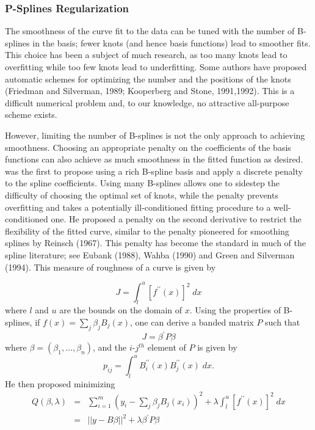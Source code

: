 \documentclass[12pt]{article}
\newcommand*\needsparaphrased{\color{red}}
\newcommand*\outlineskeleton{\color{green}}
\begin{document}
\subsubsection{{\outlineskeleton P-Splines Regularization}}

The smoothness of the curve fit to the data can be tuned with the number of B-splines in the basis; fewer knots (and hence basis functions) lead to smoother fits. This choice has been a subject of much research, as too many knots lead to overfitting while too few knots lead to underfitting. { \needsparaphrased Some authors have proposed automatic schemes for optimizing the number and the positions of the knots (Friedman and Silverman, 1989; Kooperberg and Stone, 1991,1992). This is a difficult numerical problem and, to our knowledge, no attractive all-purpose scheme exists.}

However, limiting the number of B-splines is not the only approach to achieving smoothness. Choosing an appropriate penalty on the coefficients of the basis functions can also achieve as much smoothness in the fitted function as desired. \cite{o1986statistical} was the first to propose using a rich B-spline basis and apply a discrete penalty to the spline coefficients. Using many B-splines allows one to sidestep the difficulty of choosing the optimal set of knots, while the penalty prevents overfitting and takes a potentially ill-conditioned fitting procedure to a well-conditioned one. He proposed a penalty on the second derivative to restrict the flexibility of the fitted curve, similar to the penalty pioneered for smoothing splines by Reinsch (1967). This penalty has become the standard in much of the spline literature; see Eubank (1988), Wahba (1990) and Green and Silverman (1994). This measure of roughness of a curve is given by 
 
 \[
 J = \int_l^u \left[ f^{\prime \prime}\left(x\right)\right]^2\;dx
 \]
 \noindent
 where $l$ and $u$ are the bounds on the domain of $x$. Using the properties of B-splines, if $f\left(x\right) = \sum_{j} \beta_j B_j\left(x\right)$, one can derive a banded matrix $P$ such that 
 \[
 J = \beta^\prime P \beta
 \] 
 \noindent
 where $\beta = \left(\beta_1,\dots, \beta_n\right)$, and the $i$-$j^{th}$ element of $P$ is given by
 \[
 p_{ij} = \int_l^u B_i^{\prime \prime} \left( x \right)B_j^{\prime \prime} \left( x \right)\;dx.
 \]
 \noindent
 He then proposed minimizing
 \begin{eqnarray*}
 Q\left(\beta, \lambda \right) &=& \sum_{i=1}^m \left(y_i - \sum_{j} \beta_j B_j\left(x_i \right)\right)^2 + \lambda \int_l^u \left[ f^{\prime \prime}\left(x\right)\right]^2\;dx\\
 &=& \vert \vert y - B\beta \vert  \vert^2 + \lambda\beta^\prime P \beta
 \end{eqnarray*}
\end{document}
